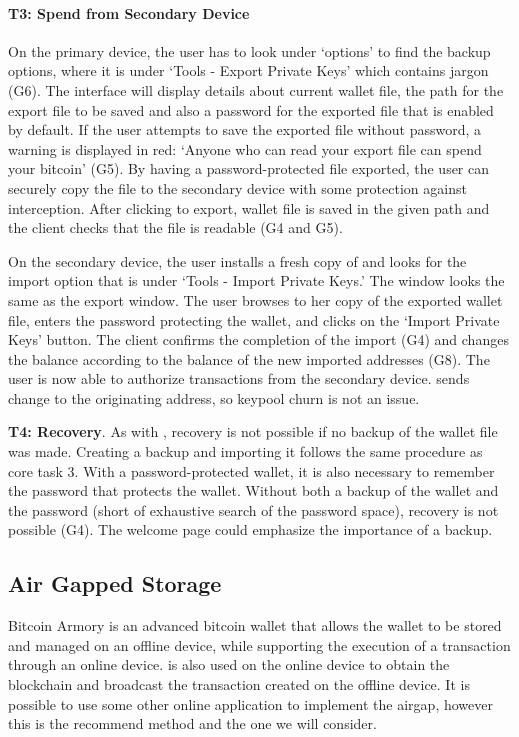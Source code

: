 \paragraph{T3: Spend from Secondary Device}
On the primary device, the user has to look under `options' to find the backup options, where it is under `Tools - Export Private Keys' which contains jargon (G6). The interface will display details about current wallet file, the path for the export file to be saved and also a password for the exported file that is enabled by default. If the user attempts to save the exported file without password, a warning is displayed in red: `Anyone who can read your export file can spend your bitcoin' (G5). By having a password-protected file exported, the user can securely copy the file to the secondary device with some protection against interception. After clicking to export, wallet file is saved in the given path and the client checks that the file is readable (G4 and G5). 

On the secondary device, the user installs a fresh copy of \multibit and looks for the import option that is under `Tools - Import Private Keys.' The window looks the same as the export window. The user browses to her copy of the exported wallet file, enters the password protecting the wallet, and clicks on the `Import Private Keys' button. The client confirms the completion of the import (G4) and changes the balance according to the balance of the new imported addresses (G8). The user is now able to authorize transactions from the secondary device. \multibit sends change to the originating address, so keypool churn is not an issue.


\textbf{T4: Recovery}.
As with \bitcoinclient, recovery is not possible if no backup of the wallet file was made. Creating a backup and importing it follows the same procedure as core task 3. With a password-protected wallet, it is also necessary to remember the password that protects the wallet. Without both a backup of the wallet and the password (short of exhaustive search of the password space), recovery is not possible (G4). The welcome page could emphasize the importance of a backup. 

\subsection{Air Gapped Storage}
\label{air gap}
Bitcoin Armory is an advanced bitcoin wallet that allows the wallet to be stored and managed on an offline device, while supporting the execution of a transaction through an online device. \armory is also used on the online device to obtain the blockchain and broadcast the transaction created on the offline device. It is possible to use some other online application to implement the airgap, however this is the recommend method and the one we will consider.

